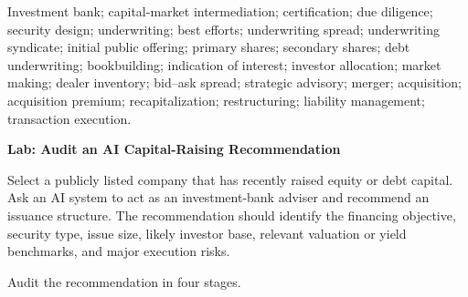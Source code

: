 

Investment bank; capital-market intermediation; certification; due diligence; security design; underwriting; best efforts; underwriting spread; underwriting syndicate; initial public offering; primary shares; secondary shares; debt underwriting; bookbuilding; indication of interest; investor allocation; market making; dealer inventory; bid--ask spread; strategic advisory; merger; acquisition; acquisition premium; recapitalization; restructuring; liability management; transaction execution.



\textbf{Lab: Audit an AI Capital-Raising Recommendation}

Select a publicly listed company that has recently raised equity or debt capital. Ask an AI system to act as an investment-bank adviser and recommend an issuance structure. The recommendation should identify the financing objective, security type, issue size, likely investor base, relevant valuation or yield benchmarks, and major execution risks.

Audit the recommendation in four stages.

